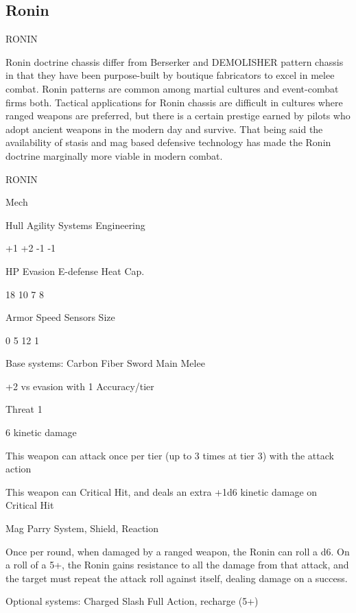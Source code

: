 \subsection{Ronin}

                                                  RONIN  

Ronin doctrine chassis differ from Berserker and DEMOLISHER pattern chassis in that they have  
been purpose-built by boutique fabricators to excel in melee combat. Ronin patterns are  
common among martial cultures and event-combat firms both. Tactical applications for Ronin  
chassis are difficult in cultures where ranged weapons are preferred, but there is a certain  
prestige earned by pilots who adopt ancient weapons in the modern day and survive. That being  
said the availability of stasis and mag based defensive technology has made the Ronin doctrine  
marginally more viable in modern combat. 
 

 RONIN 

 Mech 

 Hull       Agility      Systems       Engineering 

 +1         +2           -1            -1 

 HP         Evasion      E-defense     Heat Cap. 

 18         10           7             8 

 Armor      Speed        Sensors       Size 

 0          5            12            1 

Base systems:  
Carbon Fiber Sword  
Main Melee
 
+2 vs evasion with 1 Accuracy/tier
 
Threat 1
 
6 kinetic damage
 
This weapon can attack once per tier (up to 3 times at tier 3) with the attack action
 
This weapon can Critical Hit, and deals an extra +1d6 kinetic damage on Critical Hit
 

Mag Parry  
System, Shield, Reaction
 
Once per round, when damaged by a ranged weapon, the Ronin can roll a d6. On a roll of a 5+,  
the Ronin gains resistance to all the damage from that attack, and the target must repeat the  
attack roll against itself, dealing damage on a success.
 

Optional systems:  
Charged Slash  
Full Action, recharge (5+)
 

